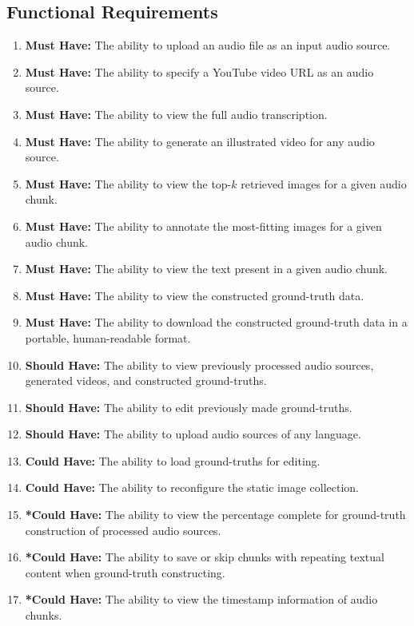 \documentclass{l4proj}
\begin{document}
\subsection{Functional Requirements}
\begin{enumerate}
    \item \label{req:1} \textbf{Must Have:} The ability to upload an audio file as an input audio source.
    \item \label{req:2} \textbf{Must Have:} The ability to specify a YouTube video URL as an audio source.
    \item \label{req:3} \textbf{Must Have:} The ability to view the full audio transcription.
    \item \label{req:4} \textbf{Must Have:} The ability to generate an illustrated video for any audio source.
    \item \label{req:5} \textbf{Must Have:} The ability to view the top-$k$ retrieved images for a given audio chunk.
    \item \label{req:6} \textbf{Must Have:} The ability to annotate the most-fitting images for a given audio chunk.
    \item \label{req:7} \textbf{Must Have:} The ability to view the text present in a given audio chunk.
    \item \label{req:8} \textbf{Must Have:} The ability to view the constructed ground-truth data.
    \item \label{req:9} \textbf{Must Have:} The ability to download the constructed ground-truth data in a portable, human-readable format.
    \item \label{req:10} \textbf{Should Have:} The ability to view previously processed audio sources, generated videos, and constructed ground-truths.
    \item \label{req:11} \textbf{Should Have:} The ability to edit previously made ground-truths.
    \item \label{req:12} \textbf{Should Have:} The ability to upload audio sources of any language.
    \item \label{req:13} \textbf{Could Have:} The ability to load ground-truths for editing.
    \item \label{req:14} \textbf{Could Have:} The ability to reconfigure the static image collection.
    \item \label{req:15} \textbf{*Could Have:} The ability to view the percentage complete for ground-truth construction of processed audio sources.
    \item \label{req:16} \textbf{*Could Have:} The ability to save or skip chunks with repeating textual content when ground-truth constructing.
    \item \label{req:17} \textbf{*Could Have:} The ability to view the timestamp information of audio chunks.
\end{enumerate}
\end{document}
